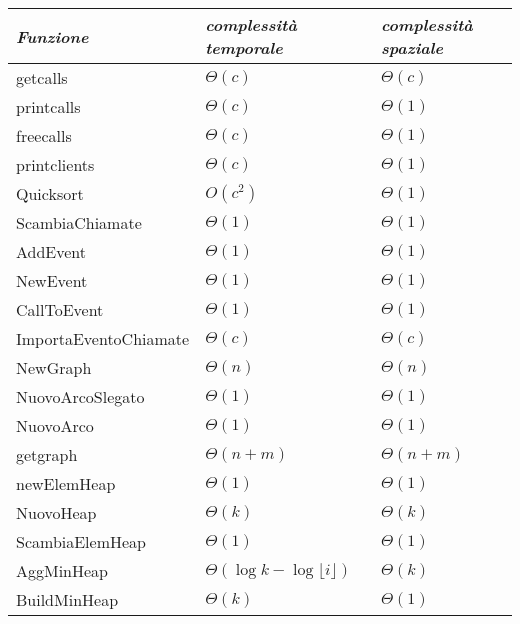 \documentclass[a4paper,11pt]{Article}
\newcommand\T{\rule{0pt}{2.6ex}}       %
\newcommand\B{\rule[-1.2ex]{0pt}{0pt}} %
\begin{document}
\begin{tabular}{p{3.8cm}p{4cm}p{4cm}}

\textit{Funzione} & \textit{complessità temporale} & \textit{complessità spaziale} \B\\
\hline
getcalls                        & $\Theta(c)$                     & $\Theta(c)$ \T\\
printcalls                      & $\Theta(c)$                     & $\Theta(1)$ \T\\
freecalls                       & $\Theta(c)$                     & $\Theta(1)$ \T\\
printclients                    & $\Theta(c)$                     & $\Theta(1)$ \T\\
Quicksort                       & $O(c^2)$                        & $\Theta(1)$ \T\\
ScambiaChiamate                 & $\Theta(1)$                     & $\Theta(1)$ \T\\
AddEvent                        & $\Theta(1)$                     & $\Theta(1)$ \T\\
NewEvent                        & $\Theta(1)$                     & $\Theta(1)$ \T\\
CallToEvent\footnotemark        & $\Theta(1)$                     & $\Theta(1)$ \T\\
ImportaEventoChiamate           & $\Theta(c)$                     & $\Theta(c)$ \T\\
NewGraph                        & $\Theta(n)$                     & $\Theta(n)$ \T\\
NuovoArcoSlegato                & $\Theta(1)$                     & $\Theta(1)$ \T\\
NuovoArco                       & $\Theta(1)$                     & $\Theta(1)$ \T\\
getgraph                        & $\Theta(n + m)$                 & $\Theta(n + m)$\T \\
newElemHeap\footnotemark[3]     & $\Theta(1)$                     & $\Theta(1)$ \T\\
NuovoHeap\footnotemark[3]       & $\Theta(k)$                     & $\Theta(k)$ \T\\
ScambiaElemHeap\footnotemark[3] & $\Theta(1)$                     & $\Theta(1)$ \T\\
AggMinHeap\footnotemark[3] \footnotemark[4] & $\Theta(\log{k} - \log{\lfloor i \rfloor})$ & $\Theta(k)$ \T \\
BuildMinHeap\footnotemark[3]    & $\Theta(k)$                     & $\Theta(1)$ \T\\
\end{tabular}
\end{document}
